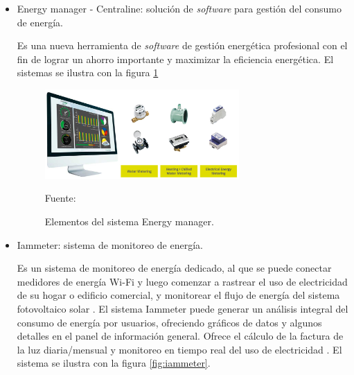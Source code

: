 \documentclass[a4paper, 12pt]{article}
\begin{document}
\begin{itemize}

\item {Energy manager - Centraline}: solución de \emph{software} para gestión del consumo de energía.

Es una nueva herramienta de \emph{software} de gestión energética profesional con el fin de lograr un ahorro importante y maximizar la eficiencia energética. El sistemas se ilustra con la figura \ref{fig:energy-vision} 

\begin{figure}[ht]
\begin{center}
\includegraphics[width=0.7\textwidth]{energy-vision}
\end{center}
\begin{center}
\vskip -0.5cm
\caption{\small{Elementos del sistema Energy manager.}}
\label{fig:energy-vision}
{\small{Fuente: \citep{WEBSITE:13}}}
\end{center}
\end{figure}

\item {Iammeter}: sistema de monitoreo de energía.

Es un sistema de monitoreo de energía dedicado, al que se puede conectar medidores de energía Wi-Fi y luego comenzar a rastrear el uso de electricidad de su hogar o edificio comercial, y monitorear el flujo de energía del sistema fotovoltaico solar \citep{WEBSITE:11}.
El sistema Iammeter puede generar un análisis integral del consumo de energía por usuarios, ofreciendo gráficos de datos y algunos detalles en el panel de información general. Ofrece el cálculo de la factura de la luz diaria/mensual y monitoreo en tiempo real del uso de electricidad \citep{WEBSITE:12}. El sistema se ilustra con la figura \ref{fig:iammeter}.


\end{itemize}
\end{document}
